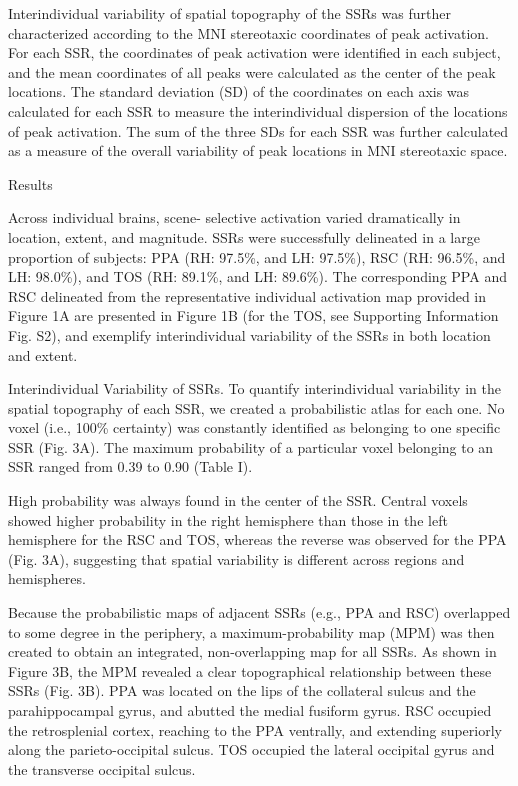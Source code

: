 %
Interindividual variability of spatial topography of the SSRs was further
characterized according to the MNI stereotaxic coordinates of peak activation.
%
For each SSR, the coordinates of peak activation were identified in each
subject, and the mean coordinates of all peaks were calculated as the center of
the peak locations.
%
The standard deviation (SD) of the coordinates on each axis was calculated for
each SSR to measure the interindividual dispersion of the locations of peak
activation.
%
The sum of the three SDs for each SSR was further calculated as a measure of the
overall variability of peak locations in MNI stereotaxic space.

Results

Across individual brains, scene- selective activation varied dramatically in
location, extent, and magnitude.
%
SSRs were successfully delineated in a large proportion of subjects: PPA (RH:
97.5\%, and LH: 97.5\%), RSC (RH: 96.5\%, and LH: 98.0\%), and TOS (RH: 89.1\%,
and LH: 89.6\%).
%
The corresponding PPA and RSC delineated from the representative individual
activation map provided in Figure 1A are presented in Figure 1B (for the TOS,
see Supporting Information Fig. S2), and exemplify interindividual variability
of the SSRs in both location and extent.

Interindividual Variability of SSRs.
%
To quantify interindividual variability in the spatial topography of each SSR,
we created a probabilistic atlas for each one.
%
No voxel (i.e., 100\% certainty) was constantly identified as belonging to one
specific SSR (Fig. 3A).
%
The maximum probability of a particular voxel belonging to an SSR ranged from
0.39 to 0.90 (Table I).

%
High probability was always found in the center of the SSR.
%
Central voxels showed higher probability in the right hemisphere than those in
the left hemisphere for the RSC and TOS, whereas the reverse was observed for
the PPA (Fig. 3A), suggesting that spatial variability is different across
regions and hemispheres.

%
Because the probabilistic maps of adjacent SSRs (e.g., PPA and RSC) overlapped
to some degree in the periphery, a maximum-probability map (MPM) was then
created to obtain an integrated, non-overlapping map for all SSRs.
%
As shown in Figure 3B, the MPM revealed a clear topographical relationship
between these SSRs (Fig. 3B).
%
PPA was located on the lips of the collateral sulcus and the parahippocampal
gyrus, and abutted the medial fusiform gyrus.
%
RSC occupied the retrosplenial cortex, reaching to the PPA ventrally, and
extending superiorly along the parieto-occipital sulcus.
%
TOS occupied the lateral occipital gyrus and the transverse occipital sulcus.


